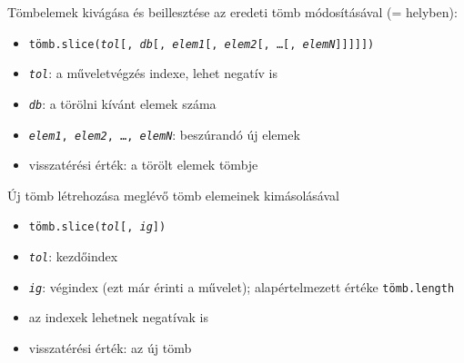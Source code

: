 \begin{frame}
  Tömbelemek kivágása és beillesztése az eredeti tömb módosításával (= helyben): 
  \begin{itemize}
    \item \texttt{tömb.slice(\emph{tol}[, \emph{db}[, \emph{elem1}[, \emph{elem2}[, \dots[, \emph{elemN}]]]]])} 
    \item \texttt{\emph{tol}}: a műveletvégzés indexe, lehet negatív is
    \item \texttt{\emph{db}}: a törölni kívánt elemek száma
    \item \texttt{\emph{elem1}, \emph{elem2}, \dots, \emph{elemN}}: beszúrandó új elemek
    \item visszatérési érték: a törölt elemek tömbje
  \end{itemize}
  \footnotesize
  \begin{exampleblock}{}
    \vspace{-0.3cm}
    
    \vspace{-0.3cm}
  \end{exampleblock}
\end{frame}

\begin{frame}
  Új tömb létrehozása meglévő tömb elemeinek kimásolásával
  \begin{itemize}
    \item \texttt{tömb.slice(\emph{tol}[, \emph{ig}])} 
    \item \texttt{\emph{tol}}: kezdőindex
    \item \texttt{\emph{ig}}: végindex (ezt már  érinti a művelet); alapértelmezett értéke \texttt{tömb.length}
    \item az indexek lehetnek negatívak is
    \item visszatérési érték: az új tömb
  \end{itemize}
  \footnotesize
  \begin{exampleblock}{}
    \vspace{-0.3cm}
    
    \vspace{-0.3cm}
  \end{exampleblock}
\end{frame}

